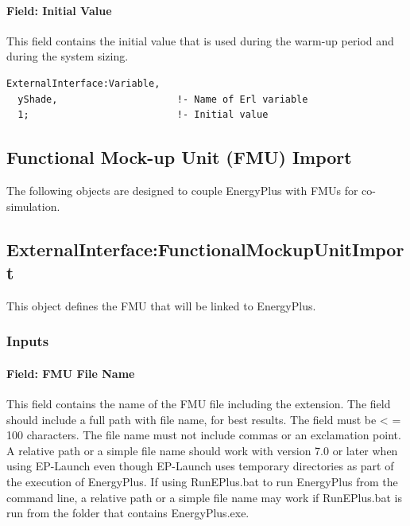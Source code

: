 \paragraph{Field: Initial Value}\label{field-initial-value-2}

This field contains the initial value that is used during the warm-up period and during the system sizing.

\begin{lstlisting}
ExternalInterface:Variable,
  yShade,                     !- Name of Erl variable
  1;                          !- Initial value
\end{lstlisting}

\subsection{Functional Mock-up Unit (FMU) Import}\label{functional-mock-up-unit-fmu-import}

The following objects are designed to couple EnergyPlus with FMUs for co-simulation.

\subsection{ExternalInterface:FunctionalMockupUnitImport}\label{externalinterfacefunctionalmockupunitimport}

This object defines the FMU that will be linked to EnergyPlus.

\subsubsection{Inputs}\label{inputs-4-012}

\paragraph{Field: FMU File Name}\label{field-fmu-file-name}

This field contains the name of the FMU file including the extension. The field should include a full path with file name, for best results. The field must be \textless{} = 100 characters. The file name must not include commas or an exclamation point. A relative path or a simple file name should work with version 7.0 or later when using EP-Launch even though EP-Launch uses temporary directories as part of the execution of EnergyPlus. If using RunEPlus.bat to run EnergyPlus from the command line, a relative path or a simple file name may work if RunEPlus.bat is run from the folder that contains EnergyPlus.exe.

